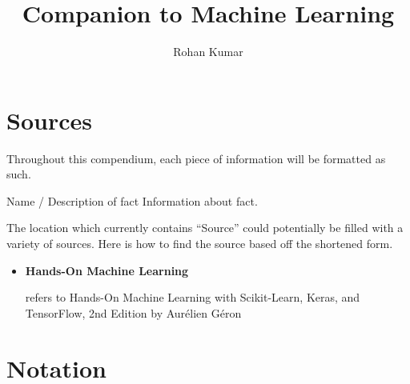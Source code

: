 \documentclass[12pt]{article}
\title{Companion to Machine Learning}
\author{Rohan Kumar}
\date{}
\newenvironment{fact*}[2][]
    {
    \begin{adjustwidth}{1em}{0em}
    \noindent
    \textbf{#2} \hfill #1
    
    \vspace{0.1in}
    \noindent
    \ignorespaces
    }
    {
    \end{adjustwidth}
    }
\begin{document}
\maketitle
\newpage
\tableofcontents
\newpage

\section*{Sources}
    Throughout this compendium, each piece of information will be formatted as such.
    
    \vspace{0.1in}
    \begin{fact*}[Source]{Name / Description of fact}
        Information about fact.
    \end{fact*}
    \vspace{0.3in}
    
    \noindent The location which currently contains ``Source'' could potentially be filled with a variety of sources. Here is how to find the source based off the shortened form.
    
    \begin{itemize}
        \item \hypertarget{homl}{\textbf{Hands-On Machine Learning}} refers to Hands-On Machine Learning with Scikit-Learn, Keras, and TensorFlow, 2nd Edition by Aurélien Géron
    \end{itemize}

\newpage

\section{Notation}
\end{document}

